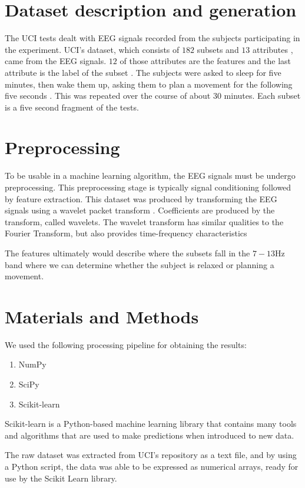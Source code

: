 \documentclass[conference,compsoc]{IEEEtran}
\begin{document}
\section{Dataset description and generation}
The UCI tests dealt with EEG signals recorded from the subjects participating in the experiment.  UCI's dataset, which consists of $182$ subsets and $13$ attributes \cite{classsvm}, came from the EEG signals. $12$ of those attributes are the features and the last attribute is the label of the subset \cite{online}. 
The subjects were asked to sleep for five minutes, then wake them up, asking them to plan a movement for the following five seconds \cite{classsvm}. This was repeated over the course of about 30 minutes. Each subset is a five second fragment of the tests.

\section{Preprocessing}
To be usable in a machine learning algorithm, the EEG signals must be undergo preprocessing.  This preprocessing stage is typically signal conditioning followed by feature extraction.  This dataset was produced by transforming the EEG signals using a wavelet packet transform \cite{wavelet} . Coefficients are produced by the transform, called wavelets. The wavelet transform has similar qualities to the Fourier Transform, but also provides time-frequency characteristics%

The features ultimately would describe where the subsets fall in the $7-13\si{\hertz}$ band where we can determine whether the subject is relaxed or planning a movement.

\section{Materials and Methods}
We used the following processing pipeline for obtaining the results:
\begin{enumerate}
\item NumPy
\item SciPy
\item Scikit-learn
\end{enumerate}

Scikit-learn is a Python-based machine learning library \cite{scikit} that contains many tools and algorithms that are used to make predictions when introduced to new data. 

The raw dataset was extracted from UCI's repository as a text file, and by using a Python script, the data was able to be expressed as numerical arrays, ready for use by the Scikit Learn library. 
\end{document}
